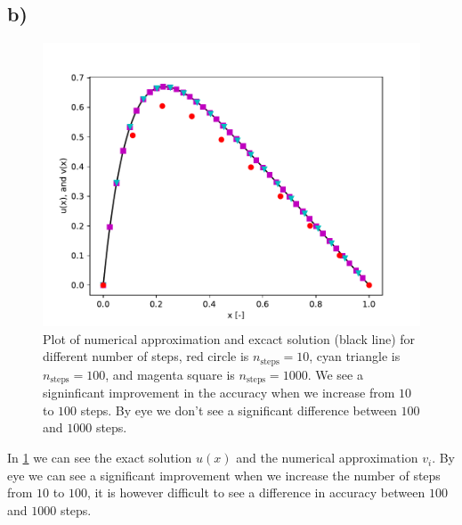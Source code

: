 \documentclass[a4paper,10pt,english]{article}
\begin{document}
\subsection{b)}
\begin{figure}[H]
  \centering
  \includegraphics[width=1.0\linewidth]{figures/plot_7.pdf}
  \caption{Plot of numerical approximation and excact solution (black line) for different number of steps, red circle is $n_{\text{steps} } = 10$, cyan triangle is $n_{\text{steps} } = 100$, and magenta
    square is $n_{\text{steps} } = 1000$. We see a signinficant improvement in the accuracy when we increase from $10$ to $100$ steps. By eye we don't see a significant difference between $100$ and $1000$ steps.}
\label{fig_plot7}
\end{figure}

In \ref{fig_plot7} we can see the exact solution $u(x)$ and the numerical approximation $v_i$. By eye we can see a significant improvement when we increase the number of steps from $10$ to $100$, it is however
difficult to see a difference in accuracy between $100$ and $1000$ steps.


\section{} %
\end{document}
